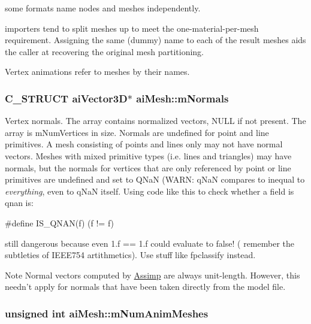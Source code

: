 \begin{DoxyItemize}
\item some formats name nodes and meshes independently.
\item importers tend to split meshes up to meet the one-\/material-\/per-\/mesh requirement. Assigning the same (dummy) name to each of the result meshes aids the caller at recovering the original mesh partitioning.
\item Vertex animations refer to meshes by their names. 
\end{DoxyItemize}\hypertarget{structai_mesh_aec81b496b4d93838cef038933dabe9b9}{
\subsubsection[{m\-Normals}]{\setlength{\rightskip}{0pt plus 5cm}C\-\_\-\-S\-T\-R\-U\-C\-T {\bf ai\-Vector3\-D}$\ast$ ai\-Mesh\-::m\-Normals}}\label{structai_mesh_aec81b496b4d93838cef038933dabe9b9}
Vertex normals. The array contains normalized vectors, N\-U\-L\-L if not present. The array is m\-Num\-Vertices in size. Normals are undefined for point and line primitives. A mesh consisting of points and lines only may not have normal vectors. Meshes with mixed primitive types (i.\-e. lines and triangles) may have normals, but the normals for vertices that are only referenced by point or line primitives are undefined and set to Q\-Na\-N (W\-A\-R\-N\-: q\-Na\-N compares to inequal to {\itshape everything}, even to q\-Na\-N itself. Using code like this to check whether a field is qnan is\-: 
\begin{DoxyCode}
\textcolor{preprocessor}{#define IS\_QNAN(f) (f != f)}
\end{DoxyCode}
 still dangerous because even 1.\-f == 1.\-f could evaluate to false! ( remember the subtleties of I\-E\-E\-E754 artithmetics). Use stuff like {\ttfamily fpclassify} instead. \begin{DoxyNote}{Note}
Normal vectors computed by \hyperlink{namespace_assimp}{Assimp} are always unit-\/length. However, this needn't apply for normals that have been taken directly from the model file. 
\end{DoxyNote}
\hypertarget{structai_mesh_a1692a300222b32348ae51779df4a697e}{
\subsubsection[{m\-Num\-Anim\-Meshes}]{\setlength{\rightskip}{0pt plus 5cm}unsigned int ai\-Mesh\-::m\-Num\-Anim\-Meshes}}\label{structai_mesh_a1692a300222b32348ae51779df4a697e}
